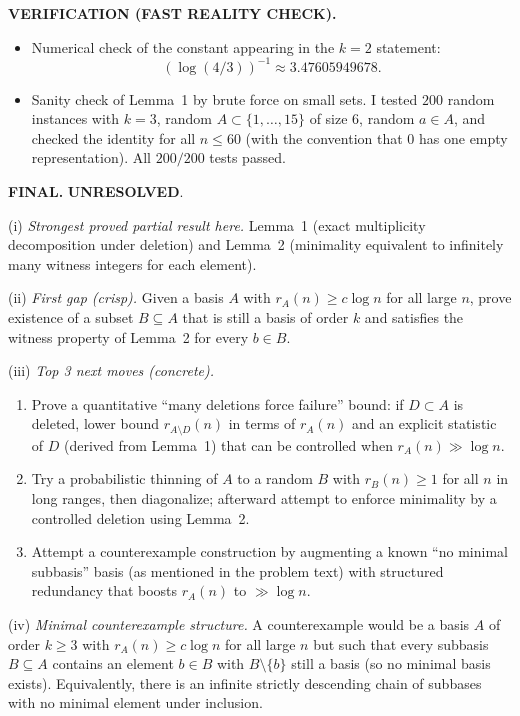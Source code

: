 \medskip
\noindent\textbf{VERIFICATION (FAST REALITY CHECK).}
\begin{itemize}
\item Numerical check of the constant appearing in the $k=2$ statement:
\[
(\log(4/3))^{-1}\approx 3.47605949678.
\]
\item Sanity check of Lemma~1 by brute force on small sets.
I tested $200$ random instances with $k=3$, random $A\subset\{1,\dots,15\}$ of size $6$, random $a\in A$, and checked the identity for all $n\le 60$ (with the convention that $0$ has one empty representation). All $200/200$ tests passed.
\end{itemize}

\medskip
\noindent\textbf{FINAL.} \textbf{UNRESOLVED}.

\noindent(i) \emph{Strongest proved partial result here.}
Lemma~1 (exact multiplicity decomposition under deletion) and Lemma~2 (minimality equivalent to infinitely many witness integers for each element).

\noindent(ii) \emph{First gap (crisp).}
Given a basis $A$ with $r_A(n)\ge c\log n$ for all large $n$, prove existence of a subset $B\subseteq A$ that is still a basis of order $k$ and satisfies the witness property of Lemma~2 for every $b\in B$.

\noindent(iii) \emph{Top 3 next moves (concrete).}
\begin{enumerate}
\item Prove a quantitative ``many deletions force failure'' bound: if $D\subset A$ is deleted, lower bound $r_{A\setminus D}(n)$ in terms of $r_A(n)$ and an explicit statistic of $D$ (derived from Lemma~1) that can be controlled when $r_A(n)\gg\log n$.
\item Try a probabilistic thinning of $A$ to a random $B$ with $r_B(n)\ge 1$ for all $n$ in long ranges, then diagonalize; afterward attempt to enforce minimality by a controlled deletion using Lemma~2.
\item Attempt a counterexample construction by augmenting a known ``no minimal subbasis'' basis (as mentioned in the problem text) with structured redundancy that boosts $r_A(n)$ to $\gg\log n$.
\end{enumerate}

\noindent(iv) \emph{Minimal counterexample structure.}
A counterexample would be a basis $A$ of order $k\ge 3$ with $r_A(n)\ge c\log n$ for all large $n$ but such that every subbasis $B\subseteq A$ contains an element $b\in B$ with $B\setminus\{b\}$ still a basis (so no minimal basis exists). Equivalently, there is an infinite strictly descending chain of subbases with no minimal element under inclusion.



